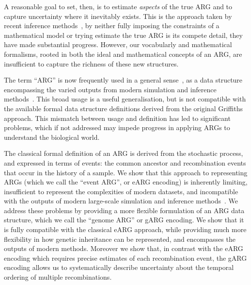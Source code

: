 \documentclass{article}
\begin{document}
A reasonable goal to set, then, is to estimate \emph{aspects}
of the true ARG and to capture uncertainty where it inevitably exists.
This is the approach taken by recent inference
methods~\citep{kelleher2019inferring,speidel2019method,zhang2023biobank},
by neither fully imposing the constraints of a mathematical
model or trying estimate the true ARG is its compete detail, they
have made substantial progress. However, our vocabularly
and mathematical formalisms, rooted in both the ideal and
mathematical concepts of an ARG, are insufficient to capture the
richness of these new structures.





The term ``ARG'' is now frequently used in a general
sense~\citep[e.g.][]{mathieson2020ancestry,hejase2020summary,
schaefer2021ancestral,harris2023using,zhang2023biobank,fan2023likelihood},
as a data structure
encompassing the varied outputs from modern simulation and
inference methods~\citep{rasmussen2014genome, palamara2016argon, haller2018tree,
kelleher2019inferring, speidel2019method, baumdicker2021efficient, zhang2023biobank}.
This broad usage is a useful generalisation,
but is not compatible with the available formal
data structure definitions
derived from the original Griffiths approach.
This mismatch between usage and definition has led to significant
problems, which if not addressed
may impede progress in applying ARGs to understand the biological world.

The classical formal definition of an ARG is derived from the
stochastic process, and expressed in terms of events:
the common ancestor and recombination events
that occur in the history of a sample. We show that this approach
to representing ARGs (which we call the ``event ARG'', or eARG
encoding) is inherently limiting, insufficient to represent
the complexities of modern datasets, and incompatible with
the outputs of modern large-scale simulation and inference
methods~\citep{kelleher2016efficient,speidel2019method,
kelleher2019inferring,zhang2023biobank}.
We address these problems by providing a more flexible formulation
of an ARG data structure, which we call the ``genome ARG''
or gARG encoding. We show that it is fully compatible with the
classical eARG approach, while providing much more flexibility
in how genetic inheritance can be represented,
and encompasses the outputs of modern methods.
Moreover we show that, in contrast with the eARG encoding which
requires precise estimates of each recombination event,
the gARG encoding allows us to systematically describe uncertainty
about the temporal ordering of multiple recombinations.
\end{document}
